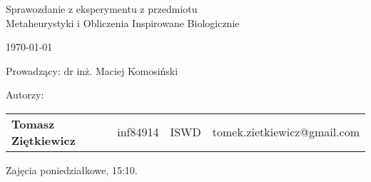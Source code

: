 \thispagestyle{empty} %

\begin{center}
{\large{Sprawozdanie z eksperymentu z przedmiotu\\
Metaheurystyki i Obliczenia Inspirowane Biologicznie}}

\vspace{3ex}



\vspace{3ex}
{\footnotesize\today}

\end{center}

\vspace{10ex}

Prowadzący: dr inż. Maciej Komosiński

\vspace{5ex}

Autorzy:
\begin{tabular}{lllr}
\textbf{Tomasz Ziętkiewicz} & inf84914 & ISWD & tomek.zietkiewicz@gmail.com \\
\end{tabular}

\vspace{5ex}

Zajęcia poniedziałkowe, 15:10.

\newpage
